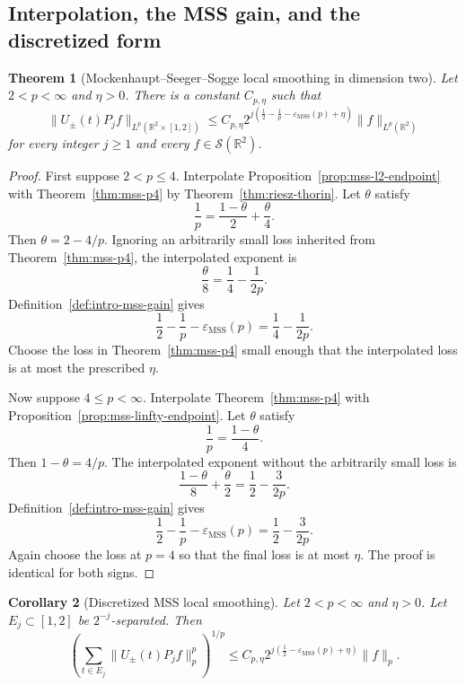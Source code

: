 \documentclass[11pt]{article}
\numberwithin{equation}{section}
\newtheorem{theorem}{Theorem}[section]
\newtheorem{corollary}[theorem]{Corollary}
\theoremstyle{definition}
\theoremstyle{remark}
\newcommand{\R}{\mathbb R}
\newcommand{\Sch}{\mathcal S}
\newcommand{\epsMSS}{\varepsilon_{\mathrm{MSS}}}
\begin{document}
\subsection{Interpolation, the MSS gain, and the discretized form}

\begin{theorem}[Mockenhaupt--Seeger--Sogge local smoothing in dimension two]\label{thm:mss-local-smoothing}
Let $2<p<\infty$ and $\eta>0$.  There is a constant $C_{p,\eta}$ such that
\[
\|U_\pm(t)P_jf\|_{L^p(\R^2\times[1,2])}
\le C_{p,\eta}2^{j(\frac12-\frac1p-\epsMSS(p)+\eta)}\|f\|_{L^p(\R^2)}
\]
for every integer $j\ge1$ and every $f\in\Sch(\R^2)$.
\end{theorem}

\begin{proof}
First suppose $2<p\le4$.  Interpolate Proposition~\ref{prop:mss-l2-endpoint} with Theorem~\ref{thm:mss-p4} by Theorem~\ref{thm:riesz-thorin}.  Let $\theta$ satisfy
\[
\frac1p=\frac{1-\theta}{2}+\frac\theta4.
\]
Then $\theta=2-4/p$.  Ignoring an arbitrarily small loss inherited from Theorem~\ref{thm:mss-p4}, the interpolated exponent is
\[
\frac\theta8=\frac14-\frac1{2p}.
\]
Definition~\ref{def:intro-mss-gain} gives
\[
\frac12-\frac1p-\epsMSS(p)=\frac14-\frac1{2p}.
\]
Choose the loss in Theorem~\ref{thm:mss-p4} small enough that the interpolated loss is at most the prescribed $\eta$.

Now suppose $4\le p<\infty$.  Interpolate Theorem~\ref{thm:mss-p4} with Proposition~\ref{prop:mss-linfty-endpoint}.  Let $\theta$ satisfy
\[
\frac1p=\frac{1-\theta}{4}.
\]
Then $1-\theta=4/p$.  The interpolated exponent without the arbitrarily small loss is
\[
\frac{1-\theta}{8}+\frac\theta2=\frac12-\frac3{2p}.
\]
Definition~\ref{def:intro-mss-gain} gives
\[
\frac12-\frac1p-\epsMSS(p)=\frac12-\frac3{2p}.
\]
Again choose the loss at $p=4$ so that the final loss is at most $\eta$.  The proof is identical for both signs.
\end{proof}

\begin{corollary}[Discretized MSS local smoothing]\label{cor:mss-discrete}
Let $2<p<\infty$ and $\eta>0$.  Let $E_j\subset[1,2]$ be $2^{-j}$-separated.  Then
\[
\left(\sum_{t\in E_j}\|U_\pm(t)P_jf\|_p^p\right)^{1/p}
\le C_{p,\eta}2^{j(\frac12-\epsMSS(p)+\eta)}\|f\|_p.
\]
\end{corollary}
\end{document}
